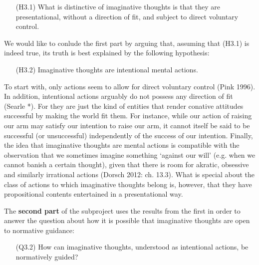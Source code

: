 \vspace{-.1cm}
\begin{itemize}[leftmargin=2cm]
\item[(H3.1)] What is distinctive of imaginative thoughts is that they are presentational, without a direction of fit, and subject to direct
voluntary control.
\end{itemize}
\vspace{-.1cm}

\noindent We would like to conlude the first part by arguing that, assuming that (H3.1) is indeed true, its truth is best explained by the
following hypothesis:

\vspace{-.1cm}
\begin{itemize}[leftmargin=2cm]
\item[(H3.2)] Imaginative thoughts are intentional mental actions.
\end{itemize}
\vspace{-.1cm}

\noindent To start with, only actions seem to allow for direct voluntary control (Pink 1996). In addition, intentional actions arguably do not possess any direction of fit (Searle *). For they are just the kind of entities that render conative attitudes successful by making the world fit them. For instance, while our action of raising our arm may satisfy our intention to raise our arm, it cannot itself be said to be successful (or unsuccessful) independently of the success of our intention. Finally, the idea that imaginative thoughts are mental actions is compatible with the observation that we sometimes imagine something `against our will' (e.g. when we cannot banish a certain thought), given that there is room for akratic, obsessive and similarly irrational actions (Dorsch 2012: ch. 13.3). What is special about the class of actions to which imaginative thoughts belong is, however, that they have propositional contents entertained in a presentational way.

The \textbf{second part} of the subproject uses the results from the first in order to answer the question about how it is possible that imaginative thoughts are open to normative guidance:

\vspace{-.1cm}
\begin{itemize}[leftmargin=2cm]
\item[(Q3.2)] How can imaginative thoughts, understood as intentional actions, be normatively guided?
\end{itemize}
\vspace{-.1cm}

